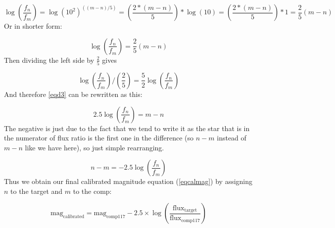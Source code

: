 \documentclass[linenumbers]{aastex631}
\begin{document}
\begin{equation}
    \log(\frac {f_n} {f_m}) = \log(10^2) ^ {((m-n)/5)} = (\frac{2*(m-n)}5)*\log(10) = (\frac{2*(m-n)}5)*1= \frac 2 5 (m-n)
\end{equation}
Or in shorter form: 

\begin{equation} \label{eqd3}
    \log(\frac {f_n} {f_m}) = \frac 2 5 (m-n)
\end{equation}
Then dividing the left side by $\frac 2 5$ gives

\begin{equation}
    \log (\frac {f_n} {f_m}) / (\frac 2 5) = \frac 5 2 \log (\frac {f_n} {f_m})
\end{equation}
And therefore \ref{eqd3} can be rewritten as this:

\begin{equation}
    2.5 \log (\frac {f_n} {f_m}) = m-n
\end{equation}
The negative is just due to the fact that we tend to write it as the star that is in the numerator of flux ratio is the first one in the difference (so $n-m$ instead of $m-n$ like we have here), so just simple rearranging.

\begin{equation}
    n-m = -2.5 \log (\frac {f_n} {f_m})
\end{equation}
Thus we obtain our final calibrated magnitude equation (\ref{eqcalmag}) by assigning $n$ to the target and $m$ to the comp: 

\begin{equation}
    \text {mag} _ {\text {calibrated}} = \text {mag} _ {\text {comp117}} - 2.5 \times \log \left( \frac {\text {flux} _ {\text {target}}} {\text {flux} _ {\text {comp117}}} \right) 
\end{equation}
{}

\end{document}
